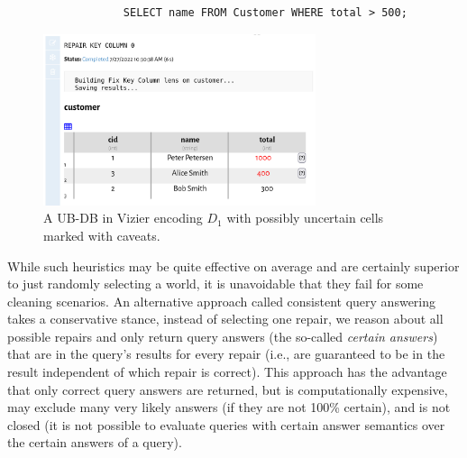\begin{lstlisting}
                  SELECT name FROM Customer WHERE total > 500;
\end{lstlisting}

\begin{figure}
  \centering
    \includegraphics[width=8cm]{graphics/caveatted_data.png}
  \caption{A UB-DB in Vizier encoding $D_1$ with possibly uncertain cells marked with caveats.}\label{fig:ub-db-encoding-d-2-with-p}
\end{figure}
While such heuristics may be quite effective on average and are certainly superior to just randomly selecting a world, it is unavoidable that they fail for some cleaning scenarios. 
An alternative approach called consistent query answering~\cite{B11} takes a conservative stance, instead of selecting one repair, we reason about all possible repairs and only return query answers (the so-called \textit{certain answers}) that are in the query's results for every repair (i.e., are guaranteed to be in the result independent of which repair is correct). 
This approach has the advantage that only correct query answers are returned, but is computationally expensive, may exclude many very likely answers (if they are not 100\% certain), and is not closed (it is not possible to evaluate queries with certain answer semantics over the certain answers of a query).


